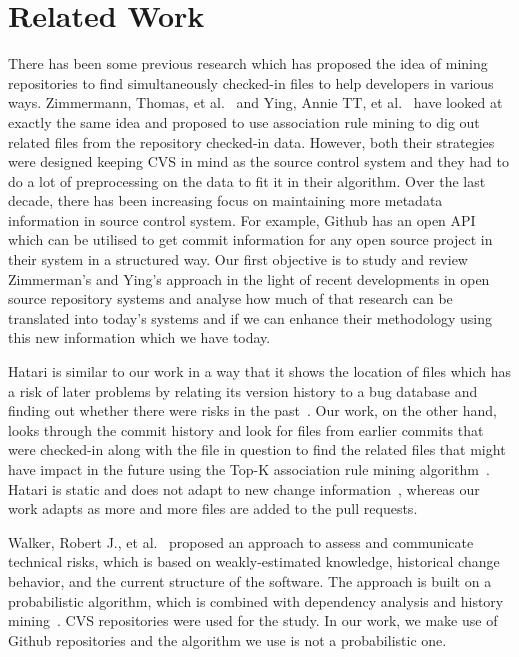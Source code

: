 
\section{Related Work}
\label{sec:related}

There has been some previous research which has proposed the idea of mining repositories to find simultaneously checked-in files to help developers in various ways. Zimmermann, Thomas, et al.~\cite{zimmermann2005mining} and Ying, Annie TT, et al.~\cite{ying2004predicting} have looked at exactly the same idea and proposed to use association rule mining to dig out related files from the repository checked-in data. However, both their strategies were designed keeping CVS in mind as the source control system and they had to do a lot of preprocessing on the data to fit it in their algorithm. Over the last decade, there has been increasing focus on maintaining more metadata information in source control system. For example, Github has an open API which can be utilised to get commit information for any open source project in their system in a structured way. Our first objective is to study and review Zimmerman's and Ying's approach in the light of recent developments in open source repository systems and analyse how much of that research can be translated into today's systems and if we can enhance their methodology using this new information which we have today.

Hatari is similar to our work in a way that it shows the location of files which has a risk of later problems by relating its version history to a bug database and finding out whether there were risks in the past~\cite{sliwerski2005hatari}. Our work, on the other hand, looks through the commit history and look for files from earlier commits that were checked-in along with the file in question to find the related files that might have impact in the future using the Top-K association rule mining algorithm~\cite{fournier2012mining}. Hatari is static and does not adapt to new change information~\cite{kim2007predicting}, whereas our work adapts as more and more files are added to the pull requests.

Walker, Robert J., et al.~\cite{walker2006lightweight} proposed an approach to assess and communicate technical risks, which is based on weakly-estimated knowledge, historical change behavior, and the current structure of the software. The approach is built on a probabilistic algorithm, which is combined with dependency analysis and history mining~\cite{lehnert2011review}. CVS repositories were used for the study. In our work, we make use of Github repositories and the algorithm we use is not a probabilistic one.






